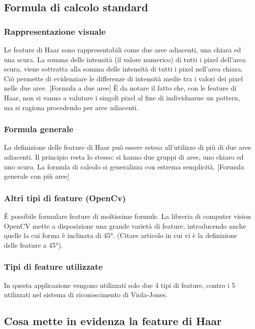         \subsection{Formula di calcolo standard}
            \subsubsection{Rappresentazione visuale}
            Le feature di Haar sono rappresentabili come due aree adiacenti, una chiara ed una scura.
            La somma delle intensità (il valore numerico) di tutti i pixel dell'area scura, viene sottratta alla somma delle intensità di tutti i pixel nell'area chiara.
            Ciò permette di evidenziare le differenze di intensità medie tra i valori dei pixel nelle due aree.
            [Formula a due aree]
            È da notare il fatto che, con le feature di Haar, non si vanno a valutare i singoli pixel al fine di individuarne un pattern, ma si ragiona procedendo per aree adiacenti.

            \subsubsection{Formula generale}
            La definizione delle feature di Haar può essere estesa all'utilizzo di più di due aree adiacenti.
            Il principio resta lo stesso: si hanno due gruppi di aree, uno chiaro ed uno scuro.
            La formula di calcolo si generalizza con estrema semplicità.
            [Formula generale con più aree]

            \subsubsection{Altri tipi di feature (OpenCv)}
            È possibile formulare feature di moltissime formule.
            La libreria di computer vision OpenCV mette a disposizione una grande varietà di feature, introducendo anche quelle la cui forma è inclinata di 45°. (Citare articolo in cui vi è la definizione delle feature a 45°).

            \subsubsection{Tipi di feature utilizzate}
            In questa applicazione vengono utilizzati solo due 4 tipi di feature, contro i 5 utilizzati nel sistema di riconoscimento di Viola-Jones.

        \subsection{Cosa mette in evidenza la feature di Haar}
